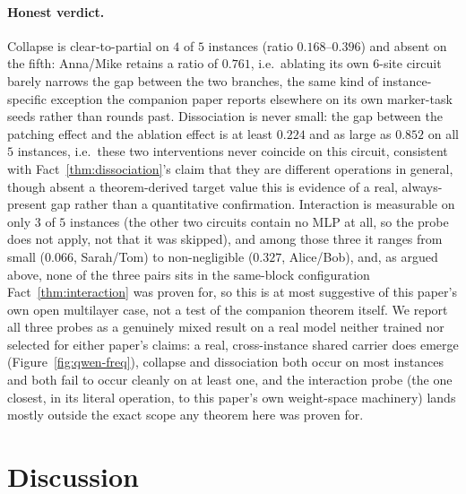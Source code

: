 \documentclass[11pt,a4paper]{article}
\begin{document}
\paragraph{Honest verdict.} Collapse is clear-to-partial on $4$ of $5$
instances (ratio $0.168$--$0.396$) and absent on the fifth: Anna/Mike
retains a ratio of $0.761$, i.e.\ ablating its own $6$-site circuit barely
narrows the gap between the two branches, the same kind of instance-specific
exception the companion paper reports elsewhere on its own marker-task
seeds rather than rounds past. Dissociation is never small: the gap between
the patching effect and the ablation effect is at least $0.224$ and as large
as $0.852$ on all $5$ instances, i.e.\ these two interventions never
coincide on this circuit, consistent with Fact~\ref{thm:dissociation}'s
claim that they are different operations in general, though absent a
theorem-derived target value this is evidence of a real, always-present gap
rather than a quantitative confirmation. Interaction is measurable on only
$3$ of $5$ instances (the other two circuits contain no MLP at all, so the
probe does not apply, not that it was skipped), and among those three it
ranges from small ($0.066$, Sarah/Tom) to non-negligible ($0.327$,
Alice/Bob), and, as argued above, none of the three pairs sits in the
same-block configuration Fact~\ref{thm:interaction} was proven for, so this
is at most suggestive of this paper's own open multilayer case, not a test
of the companion theorem itself. We report all three probes as a genuinely
mixed result on a real model neither trained nor selected for either
paper's claims: a real, cross-instance shared carrier does emerge
(Figure~\ref{fig:qwen-freq}), collapse and dissociation both occur on most
instances and both fail to occur cleanly on at least one, and the
interaction probe (the one closest, in its literal operation, to this
paper's own weight-space machinery) lands mostly outside the exact scope any
theorem here was proven for.

\section{Discussion}
\label{sec:discussion}
\end{document}
